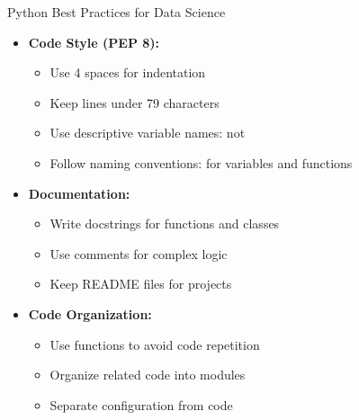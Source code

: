 \begin{frame}{Python Best Practices for Data Science}
    \begin{itemize}
        \item \textbf{Code Style (PEP 8):}
        \begin{itemize}
            \item Use 4 spaces for indentation
            \item Keep lines under 79 characters
            \item Use descriptive variable names:  not 
            \item Follow naming conventions:  for variables and functions
        \end{itemize}
        
        \item \textbf{Documentation:}
        \begin{itemize}
            \item Write docstrings for functions and classes
            \item Use comments for complex logic
            \item Keep README files for projects
        \end{itemize}
        
        \item \textbf{Code Organization:}
        \begin{itemize}
            \item Use functions to avoid code repetition
            \item Organize related code into modules
            \item Separate configuration from code
        \end{itemize}
    \end{itemize}
\end{frame}

